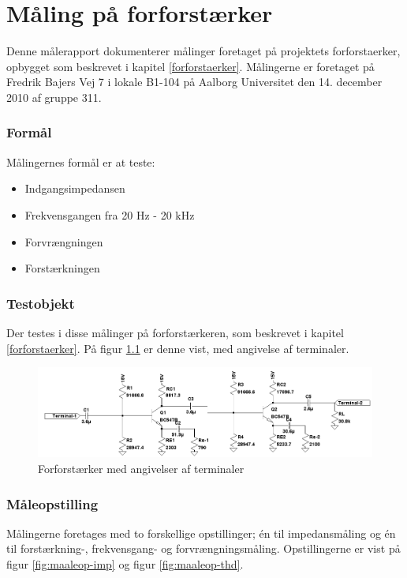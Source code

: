 \chapter{Måling på forforstærker}
\label{maaleforforstaerker}

Denne målerapport dokumenterer målinger foretaget på projektets forforstaerker, opbygget som beskrevet i kapitel \ref{forforstaerker}. Målingerne er foretaget på Fredrik Bajers Vej 7 i lokale B1-104 på Aalborg Universitet den 14. december 2010 af gruppe 311.

\subsection*{Formål}
Målingernes formål er at teste:
\begin{itemize}
\item Indgangsimpedansen
\item Frekvensgangen fra 20 Hz - 20 kHz
\item Forvrængningen
\item Forstærkningen
\end{itemize}

\subsection*{Testobjekt}
Der testes i disse målinger på forforstærkeren, som beskrevet i kapitel \ref{forforstaerker}. På figur \ref{fig:testob_forforstaerker} er denne vist, med angivelse af terminaler.

\begin{figure}[h]
\centering
\includegraphics[scale=0.42]{maalerapporter/forforstaerker/testobjekt-forforstaerker.png}
\caption{Forforstærker med angivelser af terminaler}
\label{fig:testob_forforstaerker}
\end{figure}

\subsection*{Måleopstilling}
Målingerne foretages med to forskellige opstillinger; én til impedansmåling og én til forstærkning-, frekvensgang- og forvrængningsmåling. Opstillingerne er vist på figur \ref{fig:maaleop-imp} og figur \ref{fig:maaleop-thd}.%

